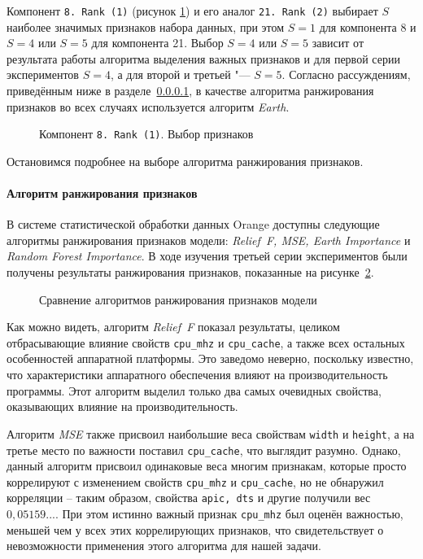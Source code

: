 Компонент \texttt{8.\,Rank~(1)} (рисунок \ref{img:8-Rank-1}) и его аналог \texttt{21.\,Rank~(2)}  выбирает $S$ наиболее значимых признаков набора данных, при этом $S = 1$ для компонента 8 и $S = 4$ или $S = 5$ для компонента 21. Выбор $S = 4$ или $S = 5$ зависит от результата работы алгоритма выделения важных признаков и для первой серии экспериментов $S = 4$, а для второй и третьей "--- $S = 5$. Согласно рассуждениям, приведённым ниже в разделе~\ref{choice-of-feature-ranking-algorithm}, в качестве алгоритма ранжирования признаков во всех случаях используется алгоритм \textit{Earth}.

\begin{figure}[tbp]
    \caption{Компонент \texttt{8.\,Rank~(1)}. Выбор признаков}
    \label{img:8-Rank-1}
\end{figure}

Остановимся подробнее на выборе алгоритма ранжирования признаков.

\paragraph{Алгоритм ранжирования признаков}
\label{choice-of-feature-ranking-algorithm}

В системе статистической обработки данных Orange доступны следующие алгоритмы ранжирования признаков модели: \textit{Relief~F, MSE, Earth Importance} и \textit{Random Forest Importance}. В ходе изучения третьей серии экспериментов были получены результаты ранжирования признаков, показанные на рисунке~\ref{img:ranking-full}.

\begin{figure}[tbp]
    \caption{Сравнение алгоритмов ранжирования признаков модели}
    \label{img:ranking-full}
\end{figure}

Как можно видеть, алгоритм \textit{Relief~F} показал результаты, целиком отбрасывающие влияние свойств \texttt{cpu\_mhz} и \texttt{cpu\_cache}, а также всех остальных особенностей аппаратной платформы. Это заведомо неверно, поскольку известно, что характеристики аппаратного обеспечения влияют на производительность программы. Этот алгоритм выделил только два самых очевидных свойства, оказывающих влияние на производительность.

Алгоритм \textit{MSE} также присвоил наибольшие веса свойствам \texttt{width} и \texttt{height}, а на третье место по важности поставил \texttt{cpu\_cache}, что выглядит разумно. Однако, данный алгоритм присвоил одинаковые веса многим признакам, которые просто коррелируют с изменением свойств \texttt{cpu\_mhz} и \texttt{cpu\_cache}, но не обнаружил корреляции -- таким образом, свойства \texttt{apic, dts} и другие получили вес $0,05159...$. При этом истинно важный признак \texttt{cpu\_mhz} был оценён важностью, меньшей чем у всех этих коррелирующих признаков, что свидетельствует о невозможности применения этого алгоритма для нашей задачи.

